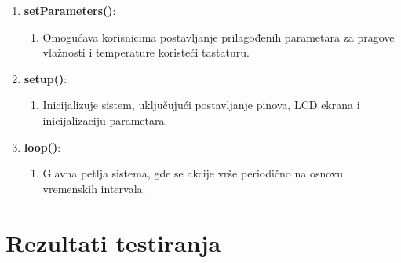 \documentclass[a4paper, 12pt]{article}
\begin{document}
\begin{enumerate}[label=\arabic*.,leftmargin=*]
    \item \textbf{setParameters()}:
        \begin{enumerate}[label={},leftmargin=*] 
            \item Omogućava korisnicima postavljanje prilagođenih parametara za pragove vlažnosti i temperature koristeći tastaturu.
        \end{enumerate}
        
    \item \textbf{setup()}:
        \begin{enumerate}[label={},leftmargin=*] 
            \item Inicijalizuje sistem, uključujući postavljanje pinova, LCD ekrana i inicijalizaciju parametara.
        \end{enumerate}
        
    \item \textbf{loop()}:
        \begin{enumerate}[label={},leftmargin=*] 
            \item Glavna petlja sistema, gde se akcije vrše periodično na osnovu vremenskih intervala.
        \end{enumerate}
\end{enumerate}

\pagebreak
\endgroup

\section{Rezultati testiranja}

\vspace{10pt}

%
%
%
%
\pagebreak
\end{document}
